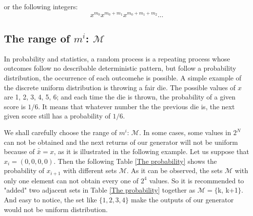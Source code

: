\noindent or the following integers:$$x^{m_0}x^{m_0+m_1}x^{m_0+m_1+m_2}\hdots$$
\subsection{ The range of $m^i$: $\mathcal{M}$}
In probability and statistics, a random process is a repeating process whose outcomes follow no describable deterministic pattern, but follow a probability distribution, the occurrence of each outcomehe is possible. A simple example of the discrete uniform distribution is throwing a fair die. The possible values of $x$ are 1, 2, 3, 4, 5, 6; and each time the die is thrown, the probability of a given score is $1/6$. It means that whatever number the the previous die is, the next given score still has a probability of  $1/6$.

We shall carefully choose the range of $m^i$: $\mathcal{M}$. In some cases, some values in $2^N$ can not be obtained and the next returns of our generator will not be uniform because of $\bar{\bar{x}}=x$, as it is illustrated in the following example. Let us suppose that $x_i = (0, 0, 0, 0)$. Then the following  Table \ref{The probability}  shows the probability of $x_{i+1}$ with different sets $\mathcal{M}$. As it can be observed, the sets $\mathcal{M}$ with only one element can not obtain every one of $2^4$ values. So it is recommended to "added" two adjacent sets in Table \ref{The probability} together as $\mathcal{M}=\{$k, k+1$\}$. And easy to notice, the set like $\{1,2,3,4\}$ make the outputs of our generator would not be uniform distribution.

